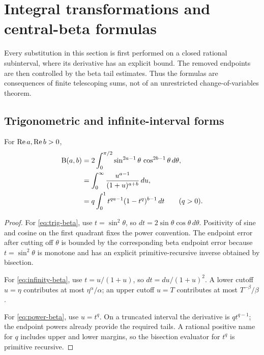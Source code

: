 \section{Integral transformations and central-beta formulas}
\label{sec:transformations}

Every substitution in this section is first performed on a closed rational subinterval, where its derivative has an explicit bound.  The removed endpoints are then controlled by the beta tail estimates.  Thus the formulas are consequences of finite telescoping sums, not of an unrestricted change-of-variables theorem.

\subsection{Trigonometric and infinite-interval forms}

\begin{theorem}\label{thm:transformed-integrals}
For $\operatorname{Re} a,\operatorname{Re} b>0$,
\begin{align}
 \mathrm B(a,b)
 &=2\int_0^{\pi/2}
       \sin^{2a-1}\theta\,\cos^{2b-1}\theta\,d\theta,
 \label{eq:trig-beta}\\
 &=\int_0^\infty
       \frac{u^{a-1}}{(1+u)^{a+b}}\,du,
 \label{eq:infinity-beta}\\
 &=q\int_0^1
       t^{qa-1}(1-t^q)^{b-1}\,dt
 \qquad(q>0).
 \label{eq:power-beta}
\end{align}
\end{theorem}

\begin{proof}
For \eqref{eq:trig-beta}, use $t=\sin^2\theta$, so
$dt=2\sin\theta\cos\theta\,d\theta$.  Positivity of sine and cosine on the first quadrant fixes the power convention.  The endpoint error after cutting off $\theta$ is bounded by the corresponding beta endpoint error because $t=\sin^2\theta$ is monotone and has an explicit primitive-recursive inverse obtained by bisection.

For \eqref{eq:infinity-beta}, use $t=u/(1+u)$, so $dt=du/(1+u)^2$.  A lower cutoff $u=\eta$ contributes at most $\eta^\alpha/\alpha$; an upper cutoff $u=T$ contributes at most $T^{-\beta}/\beta$.

For \eqref{eq:power-beta}, use $u=t^q$.  On a truncated interval the derivative is $qt^{q-1}$; the endpoint powers already provide the required tails.  A rational positive name for $q$ includes upper and lower margins, so the bisection evaluator for $t^q$ is primitive recursive.
\end{proof}

